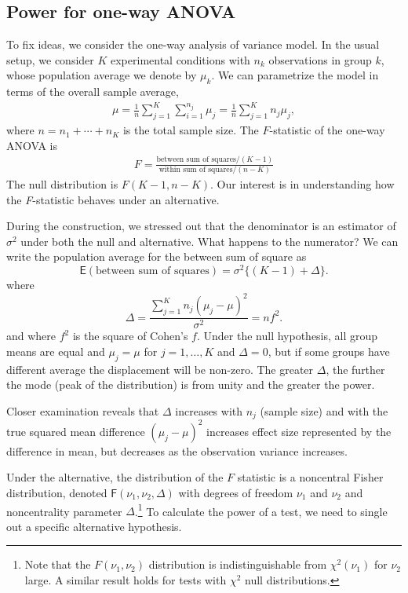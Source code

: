\documentclass[
  11pt,
  letterpaper,
]{scrbook}
\theoremstyle{definition}
\theoremstyle{definition}
\theoremstyle{remark}
\begin{document}
\subsection{Power for one-way ANOVA}\label{sec-power-oneway}

To fix ideas, we consider the one-way analysis of variance model. In the
usual setup, we consider \(K\) experimental conditions with \(n_k\)
observations in group \(k\), whose population average we denote by
\(\mu_k\). We can parametrize the model in terms of the overall sample
average, \begin{align*}
\mu = \frac{1}{n}\sum_{j=1}^K\sum_{i=1}^{n_j} \mu_j = \frac{1}{n}\sum_{j=1}^K n_j \mu_j,
\end{align*} where \(n=n_1 + \cdots +n_K\) is the total sample size. The
\(F\)-statistic of the one-way ANOVA is \begin{align*}
F =  \frac{\text{between sum of squares}/(K-1)}{\text{within sum of squares}/(n-K)}
\end{align*} The null distribution is \(F(K-1, n-K)\). Our interest is
in understanding how the \emph{F}-statistic behaves under an
alternative.

During the construction, we stressed out that the denominator is an
estimator of \(\sigma^2\) under both the null and alternative. What
happens to the numerator? We can write the population average for the
between sum of square as \[
\mathsf{E}(\text{between sum of squares}) = \sigma^2\{(K-1) + \Delta\}.
\] where \[
\Delta = \dfrac{\sum_{j=1}^K n_j(\mu_j - \mu)^2}{\sigma^2} = nf^2.
\] and where \(f^2\) is the square of Cohen's \(f\). Under the null
hypothesis, all group means are equal and \(\mu_j=\mu\) for
\(j=1, \ldots, K\) and \(\Delta=0\), but if some groups have different
average the displacement will be non-zero. The greater \(\Delta\), the
further the mode (peak of the distribution) is from unity and the
greater the power.

Closer examination reveals that \(\Delta\) increases with \(n_j\)
(sample size) and with the true squared mean difference
\((\mu_j-\mu)^2\) increases effect size represented by the difference in
mean, but decreases as the observation variance increases.

Under the alternative, the distribution of the \(F\) statistic is a
noncentral Fisher distribution, denoted
\(\mathsf{F}(\nu_1, \nu_2, \Delta)\) with degrees of freedom \(\nu_1\)
and \(\nu_2\) and noncentrality parameter \(\Delta\).\footnote{Note that
  the \(F(\nu_1, \nu_2)\) distribution is indistinguishable from
  \(\chi^2(\nu_1)\) for \(\nu_2\) large. A similar result holds for
  tests with \(\chi^2\) null distributions.} To calculate the power of a
test, we need to single out a specific alternative hypothesis.
\end{document}
